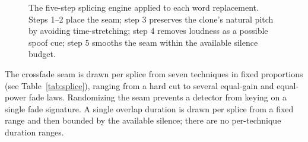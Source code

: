 \documentclass[11pt]{article}
\begin{document}
\begin{figure}[t]
\centering
{}
\caption{The five-step splicing engine applied to each word replacement.
Steps 1--2 place the seam; step 3 preserves the clone's natural pitch by
avoiding time-stretching; step 4 removes loudness as a possible spoof
cue; step 5 smooths the seam within the available silence budget.}
\label{fig:splicesteps}
\end{figure}

The crossfade seam is drawn per splice from seven techniques in fixed
proportions (see Table~\ref{tab:splice}), ranging from a hard cut to several
equal-gain and equal-power fade laws. Randomizing the seam prevents a
detector from keying on a single fade signature. A single overlap
duration is drawn per splice from a fixed range and then bounded by the
available silence; there are no per-technique duration ranges.
\end{document}
